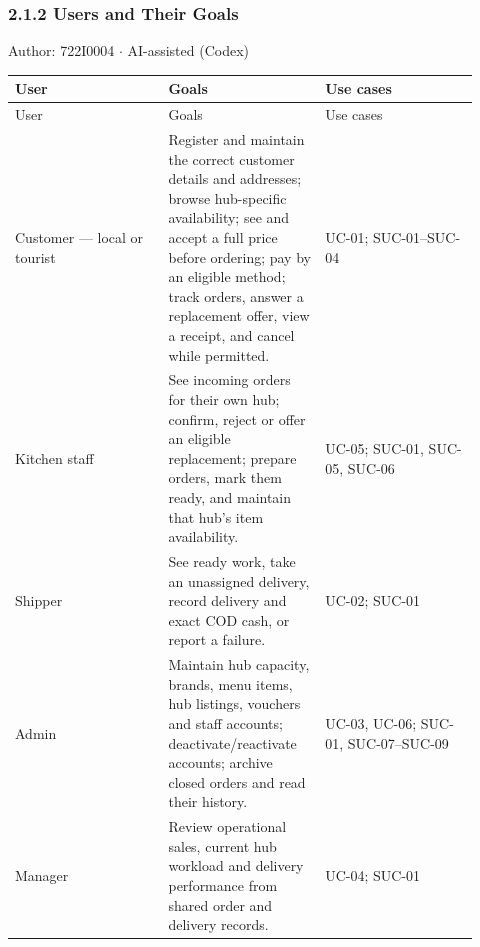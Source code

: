 \subsubsection*{2.1.2 Users and Their Goals}
Author: 722I0004 \ensuremath{\cdot} AI-assisted (Codex)

\begin{longtable}{>{\raggedright\arraybackslash}p{0.3067\linewidth}>{\raggedright\arraybackslash}p{0.3067\linewidth}>{\raggedright\arraybackslash}p{0.3067\linewidth}}
User & Goals & Use cases \\
\hline\endfirsthead
User & Goals & Use cases \\
\hline\endhead
Customer --- local or tourist & Register and maintain the correct customer details and addresses; browse hub-specific availability; see and accept a full price before ordering; pay by an eligible method; track orders, answer a replacement offer, view a receipt, and cancel while permitted. & UC-01; SUC-01--SUC-04 \\
Kitchen staff & See incoming orders for their own hub; confirm, reject or offer an eligible replacement; prepare orders, mark them ready, and maintain that hub's item availability. & UC-05; SUC-01, SUC-05, SUC-06 \\
Shipper & See ready work, take an unassigned delivery, record delivery and exact COD cash, or report a failure. & UC-02; SUC-01 \\
Admin & Maintain hub capacity, brands, menu items, hub listings, vouchers and staff accounts; deactivate/reactivate accounts; archive closed orders and read their history. & UC-03, UC-06; SUC-01, SUC-07--SUC-09 \\
Manager & Review operational sales, current hub workload and delivery performance from shared order and delivery records. & UC-04; SUC-01 \\
\end{longtable}

